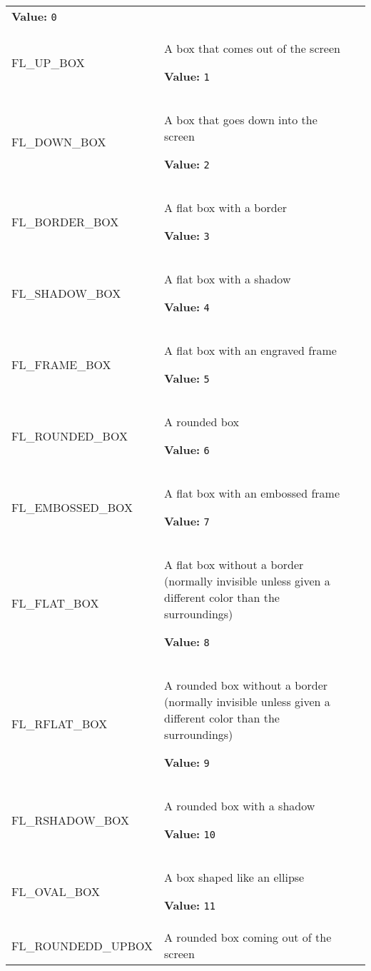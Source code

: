 \begin{longtable}{|p{\varnamewidth}|p{\vardescrwidth}|l}
\textbf{Value:} 
{\tt 0}&\\
\cline{1-2}
\raggedright F\-L\-\_\-U\-P\-\_\-B\-O\-X\- & \raggedright A box that comes out of the screen

\textbf{Value:} 
{\tt 1}&\\
\cline{1-2}
\raggedright F\-L\-\_\-D\-O\-W\-N\-\_\-B\-O\-X\- & \raggedright A box that goes down into the screen

\textbf{Value:} 
{\tt 2}&\\
\cline{1-2}
\raggedright F\-L\-\_\-B\-O\-R\-D\-E\-R\-\_\-B\-O\-X\- & \raggedright A flat box with a border

\textbf{Value:} 
{\tt 3}&\\
\cline{1-2}
\raggedright F\-L\-\_\-S\-H\-A\-D\-O\-W\-\_\-B\-O\-X\- & \raggedright A flat box with a shadow

\textbf{Value:} 
{\tt 4}&\\
\cline{1-2}
\raggedright F\-L\-\_\-F\-R\-A\-M\-E\-\_\-B\-O\-X\- & \raggedright A flat box with an engraved frame

\textbf{Value:} 
{\tt 5}&\\
\cline{1-2}
\raggedright F\-L\-\_\-R\-O\-U\-N\-D\-E\-D\-\_\-B\-O\-X\- & \raggedright A rounded box

\textbf{Value:} 
{\tt 6}&\\
\cline{1-2}
\raggedright F\-L\-\_\-E\-M\-B\-O\-S\-S\-E\-D\-\_\-B\-O\-X\- & \raggedright A flat box with an embossed frame

\textbf{Value:} 
{\tt 7}&\\
\cline{1-2}
\raggedright F\-L\-\_\-F\-L\-A\-T\-\_\-B\-O\-X\- & \raggedright A flat box without a border (normally invisible unless given a 
          different color than the surroundings)

\textbf{Value:} 
{\tt 8}&\\
\cline{1-2}
\raggedright F\-L\-\_\-R\-F\-L\-A\-T\-\_\-B\-O\-X\- & \raggedright A rounded box without a border (normally invisible unless given a
          different color than the surroundings)

\textbf{Value:} 
{\tt 9}&\\
\cline{1-2}
\raggedright F\-L\-\_\-R\-S\-H\-A\-D\-O\-W\-\_\-B\-O\-X\- & \raggedright A rounded box with a shadow

\textbf{Value:} 
{\tt 10}&\\
\cline{1-2}
\raggedright F\-L\-\_\-O\-V\-A\-L\-\_\-B\-O\-X\- & \raggedright A box shaped like an ellipse

\textbf{Value:} 
{\tt 11}&\\
\cline{1-2}
\raggedright F\-L\-\_\-R\-O\-U\-N\-D\-E\-D\-3\-D\-\_\-U\-P\-B\-O\-X\- & \raggedright A rounded box coming out of the screen


\end{longtable}

